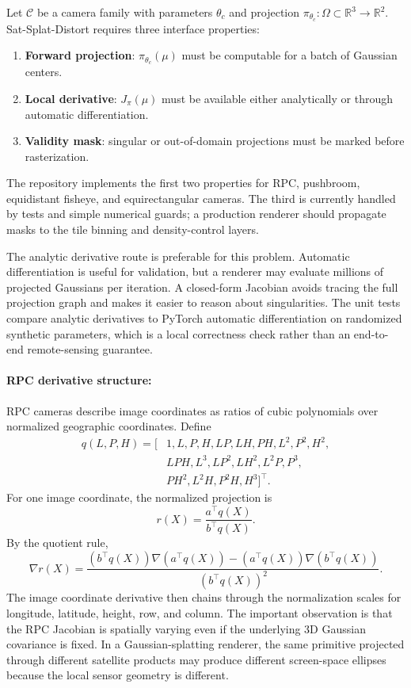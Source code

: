 \documentclass{article}
\begin{document}
Let $\mathcal{C}$ be a camera family with parameters $\theta_c$ and projection $\pi_{\theta_c}:\Omega\subset\mathbb{R}^3\rightarrow\mathbb{R}^2$. Sat-Splat-Distort requires three interface properties:
\begin{enumerate}
  \item \textbf{Forward projection}: $\pi_{\theta_c}(\mu)$ must be computable for a batch of Gaussian centers.
  \item \textbf{Local derivative}: $J_{\pi}(\mu)$ must be available either analytically or through automatic differentiation.
  \item \textbf{Validity mask}: singular or out-of-domain projections must be marked before rasterization.
\end{enumerate}
The repository implements the first two properties for RPC, pushbroom, equidistant fisheye, and equirectangular cameras. The third is currently handled by tests and simple numerical guards; a production renderer should propagate masks to the tile binning and density-control layers.

The analytic derivative route is preferable for this problem. Automatic differentiation is useful for validation, but a renderer may evaluate millions of projected Gaussians per iteration. A closed-form Jacobian avoids tracing the full projection graph and makes it easier to reason about singularities. The unit tests compare analytic derivatives to PyTorch automatic differentiation on randomized synthetic parameters, which is a local correctness check rather than an end-to-end remote-sensing guarantee.

\paragraph{RPC derivative structure:}

RPC cameras describe image coordinates as ratios of cubic polynomials over normalized geographic coordinates. Define
\begin{equation}
\begin{aligned}
q(L,P,H)=[&1,L,P,H,LP,LH,PH,L^2,P^2,H^2,\\
&LPH,L^3,LP^2,LH^2,L^2P,P^3,\\
&PH^2,L^2H,P^2H,H^3]^\top .
\end{aligned}
\end{equation}
For one image coordinate, the normalized projection is
\begin{equation}
  r(X) = \frac{a^\top q(X)}{b^\top q(X)}.
\end{equation}
By the quotient rule,
\begin{equation}
  \nabla r(X)=\frac{(b^\top q(X))\nabla(a^\top q(X))-(a^\top q(X))\nabla(b^\top q(X))}{(b^\top q(X))^2}.
\end{equation}
The image coordinate derivative then chains through the normalization scales for longitude, latitude, height, row, and column. The important observation is that the RPC Jacobian is spatially varying even if the underlying 3D Gaussian covariance is fixed. In a Gaussian-splatting renderer, the same primitive projected through different satellite products may produce different screen-space ellipses because the local sensor geometry is different.
\end{document}
